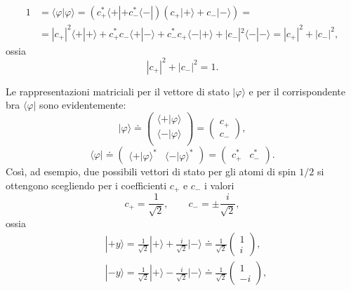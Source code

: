 	\begin{equation}
		\begin{aligned}
			1 & =\langle \varphi | \varphi \rangle = (c^*_+\langle + | +c^*_- \langle - |)(c_+| + \rangle +c_- | - \rangle)=\\
			&=| c_+|^2\langle + | + \rangle +c^*_+c_- \langle + | - \rangle +c^*_-c_+ \langle - | + \rangle +|c_-|^2 \langle - | - \rangle =|c_+|^2+|c_-|^2 ,
				\end{aligned} 
	\end{equation}
ossia 
	\begin{equation}
		\boxed{
			|c_+|^2+|c_-|^2=1 .
			}
	\end{equation}

Le rappresentazioni matriciali per il vettore di stato $| \varphi \rangle $ e per il corrispondente bra $\langle \varphi |$ sono evidentemente:
	\begin{equation}
 		\boxed{
 			| \varphi \rangle \doteq
			\begin{pmatrix}
			\langle + | \varphi \rangle\\
			\langle - | \varphi \rangle \\
			\end{pmatrix} = 
			\begin{pmatrix}
			c_+ \\
			c_-
			\end{pmatrix} ,
			}
	\end{equation}
	\begin{equation}
		\boxed{
			\langle \varphi | \doteq
			\begin{pmatrix}
			\langle + | \varphi \rangle ^* &
			\langle - | \varphi \rangle ^* 
			\end{pmatrix} = 
			\begin{pmatrix}
			c^*_+ & c^*_-
			\end{pmatrix} .
			}
	\end{equation}
Così, ad esempio, due possibili vettori di stato per gli atomi di spin $1/2$ si ottengono scegliendo per i coefficienti $c_+$ e $c_-$ i valori
	\begin{equation}
		c_+=\frac{1}{\sqrt{2}}, \qquad c_-=\pm \frac{i}{\sqrt{2}} ,
	\end{equation}
ossia
	\begin{equation}
		\boxed{
			\begin{aligned}
			&|+y \rangle = \frac{1}{\sqrt{2}}|+ \rangle +\frac{i}{\sqrt{2}}| - \rangle \doteq \frac{1}{\sqrt{2}}
			\begin{pmatrix}
			1 \\
			i
			\end{pmatrix} ,\\
			&| -y \rangle = \frac{1}{\sqrt{2}}| + \rangle -\frac{i}{\sqrt{2}}| - \rangle \doteq \frac{1}{\sqrt{2}}
			\begin{pmatrix}
			1 \\
			-i
			\end{pmatrix} ,
			\end{aligned} 
			}
	\label{cap3_15}
	\end{equation}
